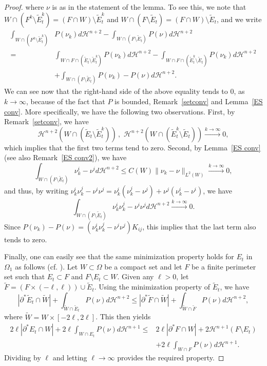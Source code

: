 \documentclass[11pt]{amsart}
\def\H{\mathcal{H}}
\def\wt{\widetilde}
\begin{document}
\begin{proof}
where $\nu$ is as in the statement of the lemma. To see this, we note that
$W\cap (F^k\setminus \wt E^k_t)=(F\cap W)\setminus\wt E_t^k$ and $ W\cap (F\setminus \wt E_t)=(F\cap W)\setminus \wt E_t$, and 
we  write
\[\begin{split}\int_{W\cap (F^k\setminus \wt E^k_t)} &P(\nu_k)d\H^{n+2}-\int_{W\cap (F\setminus \wt E_t)} P(\nu)d\H^{n+2}
\\
=& \int_{W\cap F\cap(\wt E_t\setminus\wt E_t^k)} P(\nu_k)d\H^{n+2}-\int_{W\cap F\cap(\wt E^k_t\setminus\wt E_t)} P(\nu_k)d\H^{n+2}\\
&+ \int_{W\cap (F\setminus \wt E_t)} P(\nu_k)-P(\nu)d\H^{n+2}.
\end{split}\]
We can see now that the right-hand side of the above equality tends to $0$, as $k\to \infty$, because of the fact that $P$ is bounded, Remark~\ref{setconv} and Lemma~\ref{ES conv}. More specifically, we have the following two observations. First, by Remark~\ref{setconv}, we have
\[\H^{n+2}(W\cap (\wt E_t\setminus \wt E^k_t))\,,\,\, \H^{n+2}(W\cap (\wt E_t^k\setminus \wt E_t))\stackrel{k\to \infty}{\longrightarrow} 0,\]
which implies that the first two terms tend to zero. Second, by Lemma~\ref{ES conv} (see also Remark~\ref{ES conv2}), we  have
\[\int_{W\cap (F\setminus \wt E_t)} \nu_k^i-\nu^id\H^{n+2}\le C(W)\|\nu_k-\nu\|_{L^2(W)} \stackrel{k\to \infty}{\longrightarrow}0,\]
and thus, by writing $\nu_k^i\nu_k^j-\nu^i\nu^j=\nu_k^i(\nu_k^j-\nu^j)+\nu^j(\nu_k^i-\nu^i)$, we have
\[\int_{W\cap (F\setminus \wt E_t)} \nu_k^i\nu_k^j-\nu^i\nu^jd\H^{n+2}\stackrel{k\to \infty}{\longrightarrow}0.\]
Since $P(\nu_k)- P(\nu)= (\nu_k^i\nu_k^j-\nu^i\nu^j) K_{ij}$, this implies that the last term also tends to zero.

Finally, one can easily see that the same minimization property holds for $E_t$ in $\Omega_1$ as follows (cf. \cite[Corollary 5.7]{S08}). Let $W\subset \Omega$ be a compact set and let $F$ be a finite perimeter set such that $E_t\subset F$ and $F\setminus E_t\subset W$. Given any $\ell>0$, let $\wt F=(F\times(-\ell,\ell))\cup \wt E_t$. Using the minimization property of  $\wt E_t$, we have
\[|\partial^*\wt E_t\cap \wt W|+\int_{\wt W\cap \wt E_t} P(\nu)d\H^{n+2}\le |\partial^*\wt F\cap \wt W|+\int_{\wt W\cap \wt F} P(\nu)d\H^{n+2},\]
where $\wt W=W\times[-2\ell, 2\ell]$. This then yields
\[\begin{split}
2\ell|\partial^* E_t\cap W|+2\ell \int_{ W\cap  E_t} P(\nu)d\H^{n+1}\le& 2\ell|\partial^* F\cap  W|+2\H^{n+1}(F\setminus E_t)\\
&+2\ell \int_{W\cap  F} P(\nu)d\H^{n+1}.
\end{split}\]
Dividing by $\ell$ and letting $\ell\to \infty$ provides the required property.
\end{proof}
\end{document}
